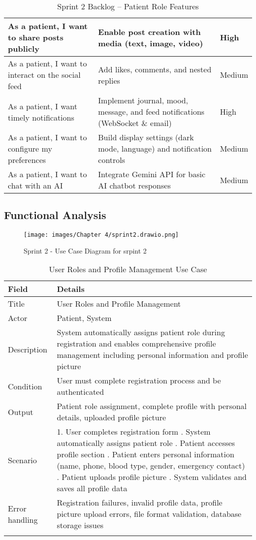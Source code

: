 \begin{table}[H]
\begin{tabular}{|p{4.2cm}|p{7.2cm}|p{2.2cm}|}
As a patient, I want to share posts publicly & Enable post creation with media (text, image, video) & High \\
\hline
As a patient, I want to interact on the social feed & Add likes, comments, and nested replies & Medium \\
\hline
As a patient, I want timely notifications & Implement journal, mood, message, and feed notifications (WebSocket \& email) & High \\
\hline
As a patient, I want to configure my preferences & Build display settings (dark mode, language) and notification controls & Medium \\
\hline
As a patient, I want to chat with an AI & Integrate Gemini API for basic AI chatbot responses & Medium \\
\hline
\end{tabular}
\caption{Sprint 2 Backlog -- Patient Role Features}
\end{table}


\subsection{Functional Analysis}
\begin{figure}[H]
    \centering
    \texttt{[image: images/Chapter 4/sprint2.drawio.png]}
    \caption{Sprint 2 - Use Case Diagram for srpint 2}
    \label{fig:use_case_patient}
\end{figure}
\begin{longtable}{|p{3cm}|p{12cm}|}
\hline
\textbf{Field} & \textbf{Details} \\
\hline
Title & User Roles and Profile Management \\
\hline
Actor & Patient, System \\
\hline
Description & System automatically assigns patient role during registration and enables comprehensive profile management including personal information and profile picture \\
\hline
Condition & User must complete registration process and be authenticated \\
\hline
Output & Patient role assignment, complete profile with personal details, uploaded profile picture \\
\hline
Scenario & 1. User completes registration form \newline 2. System automatically assigns patient role \newline 3. Patient accesses profile section \newline 4. Patient enters personal information (name, phone, blood type, gender, emergency contact) \newline 5. Patient uploads profile picture \newline 6. System validates and saves all profile data \\
\hline
Error handling & Registration failures, invalid profile data, profile picture upload errors, file format validation, database storage issues \\
\hline
\caption{User Roles and Profile Management Use Case}
\end{longtable}

